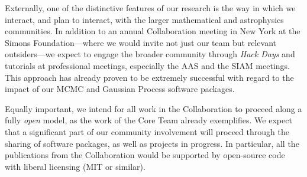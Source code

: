 \documentclass[12pt]{article}
\begin{document}
Externally, one of the distinctive features of our research is the way
in which we interact, and plan to interact, with the larger mathematical
and astrophysics communities.
In addition to an annual Collaboration meeting in New York at the Simons
Foundation---where we would invite not just our team but relevant
outsiders---we expect to engage the broader community through \emph{Hack
Days} and tutorials at professional meetings, especially the AAS and the SIAM meetings.
This approach has already proven to be extremely successful with regard
to the impact of our MCMC and Gaussian Process software packages.

Equally important, we intend for all work in the Collaboration to
proceed along a fully \emph{open} model, as the work of the Core Team
already exemplifies.
We expect that a significant part of our community involvement will
proceed through the sharing of software packages, as well as projects in
progress.
In particular, all the publications from the Collaboration would be
supported by open-source code with liberal licensing (MIT or similar).
\end{document}
